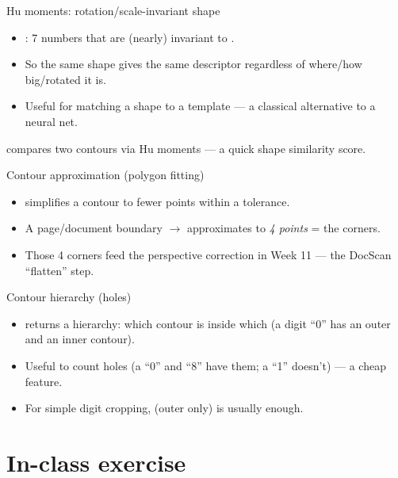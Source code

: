 \documentclass[10pt,aspectratio=169]{beamer}
\begin{document}
\begin{frame}{Hu moments: rotation/scale-invariant shape}
  \begin{itemize}
    \item {}: 7 numbers that are (nearly) invariant to .
    \item So the same shape gives the same descriptor regardless of where/how big/rotated it is.
    \item Useful for matching a shape to a template — a classical alternative to a neural net.
  \end{itemize}
  \begin{goodbox}
     compares two contours via Hu moments — a quick shape similarity score.
  \end{goodbox}
\end{frame}

\begin{frame}{Contour approximation (polygon fitting)}
  \begin{itemize}
    \item {} simplifies a contour to fewer points within a tolerance.
    \item A page/document boundary $\rightarrow$ approximates to \emph{4 points} = the corners.
    \item Those 4 corners feed the perspective correction in Week 11 — the DocScan ``flatten'' step.
  \end{itemize}
\end{frame}

\begin{frame}{Contour hierarchy (holes)}
  \begin{itemize}
    \item {} returns a hierarchy: which contour is inside which (a digit ``0'' has an outer and an inner contour).
    \item Useful to count holes (a ``0'' and ``8'' have them; a ``1'' doesn't) — a cheap feature.
    \item For simple digit cropping,  (outer only) is usually enough.
  \end{itemize}
\end{frame}

\section{In-class exercise}
\end{document}
